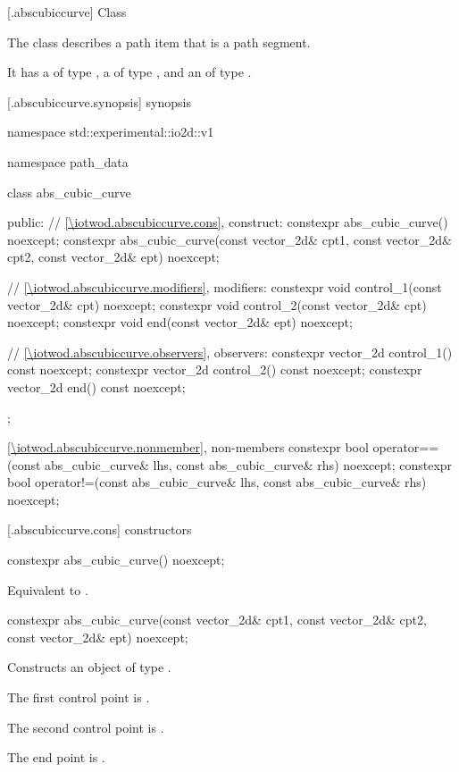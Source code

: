  [\iotwod.abscubiccurve] {Class }

\pnum
{}%
The class  describes a path item that is a path segment.

\pnum
It has a  of type , a  of type , and an  of type .

 [\iotwod.abscubiccurve.synopsis] { synopsis}

\begin{codeblock}
namespace std::experimental::io2d::v1 {
  namespace path_data {
    class abs_cubic_curve {
    public:
      // \ref{\iotwod.abscubiccurve.cons}, construct:
      constexpr abs_cubic_curve() noexcept;
      constexpr abs_cubic_curve(const vector_2d& cpt1, const vector_2d& cpt2,
        const vector_2d& ept) noexcept;

      // \ref{\iotwod.abscubiccurve.modifiers}, modifiers:
      constexpr void control_1(const vector_2d& cpt) noexcept;
      constexpr void control_2(const vector_2d& cpt) noexcept;
      constexpr void end(const vector_2d& ept) noexcept;

      // \ref{\iotwod.abscubiccurve.observers}, observers:
      constexpr vector_2d control_1() const noexcept;
      constexpr vector_2d control_2() const noexcept;
      constexpr vector_2d end() const noexcept;
    };
    
    \ref{\iotwod.abscubiccurve.nonmember}, non-members
    constexpr bool operator==(const abs_cubic_curve& lhs,
      const abs_cubic_curve& rhs) noexcept;
    constexpr bool operator!=(const abs_cubic_curve& lhs,
      const abs_cubic_curve& rhs) noexcept;
  }
}
\end{codeblock}

 [\iotwod.abscubiccurve.cons] { constructors}

%
\begin{itemdecl}
constexpr abs_cubic_curve() noexcept;
\end{itemdecl}
\begin{itemdescr}
\pnum
\effects
Equivalent to .
\end{itemdescr}

%
\begin{itemdecl}
constexpr abs_cubic_curve(const vector_2d& cpt1, const vector_2d& cpt2,
  const vector_2d& ept) noexcept;
\end{itemdecl}
\begin{itemdescr}
\pnum
\effects
Constructs an object of type .

\pnum
The first control point is .

\pnum
The second control point is .

\pnum
The end point is .
\end{itemdescr}

